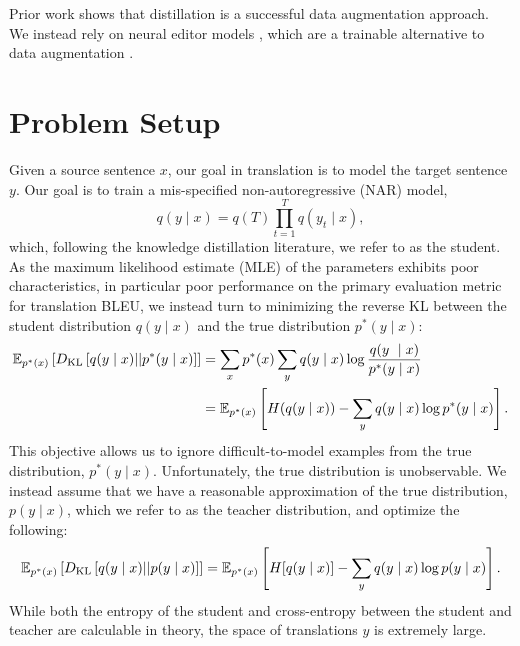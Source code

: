 \documentclass[11pt]{article}
\begin{document}
Prior work shows that distillation is a successful data augmentation approach.
We instead rely on neural editor models \citep{edit},
which are a trainable alternative to data augmentation \citep{recombine}.

\section{Problem Setup}
Given a source sentence $x$, our goal in translation is to model the target sentence $y$.
Our goal is to train a mis-specified non-autoregressive (NAR) model,
$$q(y \mid x) = q(T)\prod_{t=1}^T q(y_t \mid x),$$
which, following the knowledge distillation literature, we refer to as the student.
As the maximum likelihood estimate (MLE) of the parameters exhibits poor characteristics,
in particular poor performance on the primary evaluation metric for translation BLEU,
we instead turn to minimizing the reverse KL between the student distribution $q(y\mid x)$
and the true distribution $p^*(y \mid x)$:
\begin{equation}
\begin{aligned}
\mathbb{E}_{p^*(x)}\left[D_\mathrm{KL}\left[q(y \mid x) || p^*(y \mid x)\right]\right]
&= \sum_x p^*(x)\sum_y q(y \mid x) \log \frac{q(y\ \mid x)}{p^*(y \mid x)}\\
&= \mathbb{E}_{p^*(x)}\left[H(q(y \mid x)) - \sum_y q(y \mid x) \log p^*(y \mid x)\right].
\end{aligned}
\end{equation}
This objective allows us to ignore difficult-to-model examples from the true distribution,
$p^*(y \mid x)$.
Unfortunately, the true distribution is unobservable.
We instead assume that we have a reasonable approximation of the true distribution, $p(y \mid x)$,
which we refer to as the teacher distribution, and optimize the following:
\begin{equation}
\label{eqn:rev-kl}
\mathbb{E}_{p^*(x)}\left[D_\mathrm{KL}\left[q(y \mid x) || p(y \mid x)\right]\right]
= \mathbb{E}_{p^*(x)}\left[H[q(y\mid x)] - \sum_y q(y \mid x) \log p(y \mid x)\right].
\end{equation}
While both the entropy of the student and cross-entropy between the student and teacher are
calculable in theory, the space of translations $y$ is extremely large.
\end{document}
